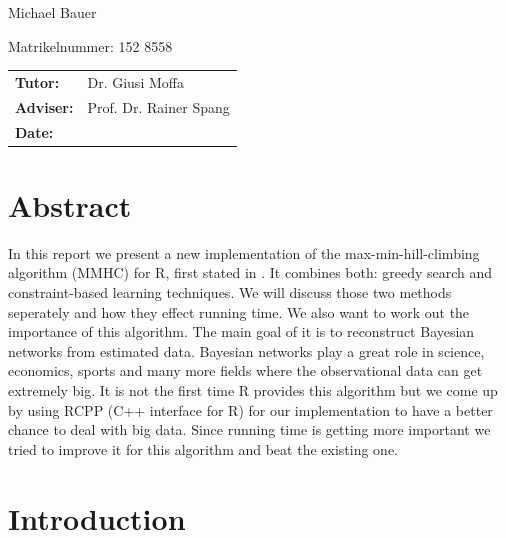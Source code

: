 \begin{center}
\begin{large}
Michael Bauer
\end{large}

\begin{small}
Matrikelnummer: 152 8558
\end{small}

\vspace{1cm}
\begin{tabular}{ll}
{\bf Tutor:} &Dr. Giusi Moffa\\
{\bf Adviser:} &Prof. Dr. Rainer Spang\\
{\bf Date:} &\\
\end{tabular}

\end{center}
\clearpage


\pagestyle{useheadings} %

\tableofcontents
\listoffigures
\listoftables

\chapter{Abstract}

In this report we present a new implementation of the max-min-hill-climbing algorithm (MMHC) for R, first stated in \cite{TBA}. It combines both: greedy search and constraint-based learning techniques. We will discuss those two methods seperately and how they effect running time. We also want to work out the importance of this algorithm. The main goal of it is to reconstruct Bayesian networks from estimated data. Bayesian networks play a great role in science, economics, sports and many more fields where the observational data can get extremely big. It is not the first time R provides this algorithm but we come up by using RCPP (C++ interface for R) for our implementation to have a better chance to deal with big data. Since running time is getting more important we tried to improve it for this algorithm and beat the existing one.

\chapter{Introduction}

